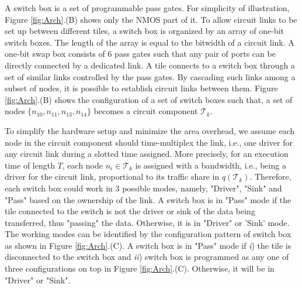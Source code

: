 {{A switch box is a set of programmable pass gates. For simplicity of illustration, Figure \ref{fig:Arch}.(B) shows only the NMOS part of it. To allow circuit links to be set up between different tiles,  a switch box is organized by an array of one-bit switch boxes. The length of the array is equal to the bitwidth of a circuit link. A one-bit swap box consists of 6 pass gates such that any pair of ports can be directly connected by a dedicated link. A tile connects to a switch box through a set of similar links controlled by the pass gates. By cascading such links among a subset of nodes, it is possible to establish circuit links between them.  Figure \ref{fig:Arch}.(B) shows the configuration of a set of switch boxes such that, a set of nodes $\{n_{10},n_{11},n_{13}, n_{14}\}$ becomes a circuit component $\mathcal T_{k}$.

To simplify the hardware setup and minimize the area overhead, we assume each node in the circuit component should time-multiplex the link, i.e., one driver for any circuit link during a slotted time assigned. More precisely, for an execution time of length $T$, each node $n_{i} \in \mathcal T_{k}$ is assigned with a bandwidth, i.e., being a driver for the circuit link, proportional to its traffic share in $q(\mathcal T_{k})$.  Therefore, each switch box could work in 3 possible modes, namely, "Driver", "Sink" and "Pass" based on the ownership of the link. A switch box is in "Pass" mode if the tile connected to the switch is not the driver or sink of the data being transferred, thus "passing" the data. Otherwise, it is in "Driver" or 'Sink' mode. The working modes can be identified by the configuration pattern of switch box as shown in Figure \ref{fig:Arch}.(C). A switch box is in "Pass" mode if \textit{i}) the tile is disconnected to the switch box and \textit{ii}) switch box is programmed as any one of three configurations on top in Figure \ref{fig:Arch}.(C). Otherwise, it will be in "Driver" or "Sink".

}}
